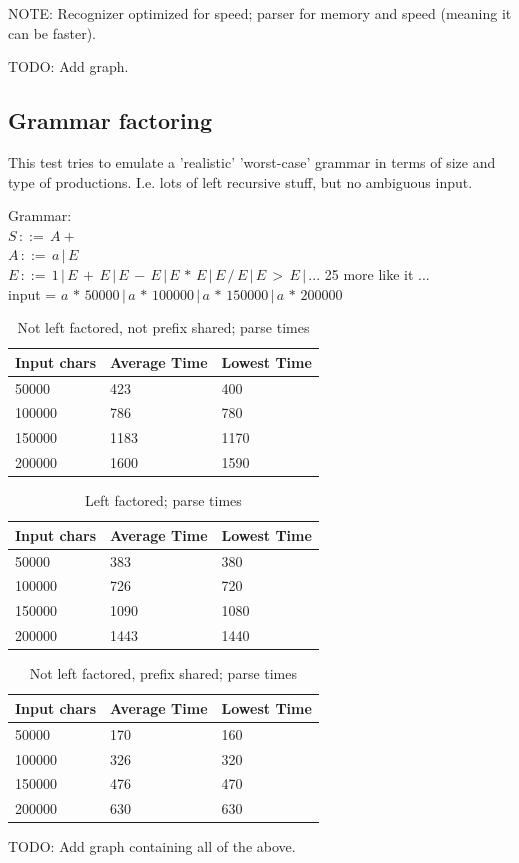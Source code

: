 \documentclass[a4paper,10pt]{article}
\begin{document}
NOTE: Recognizer optimized for speed; parser for memory and speed (meaning it can be faster).

TODO: Add graph.

\subsection{Grammar factoring}

This test tries to emulate a 'realistic' 'worst-case' grammar in terms of size and type of productions. I.e. lots of left recursive stuff, but no ambiguous input.

Grammar:\\
$S\,::=\,A+$\\
$A\,::=\,a\,|\,E$\\
$E\,::=\,1\,|\,E\,+\,E\,|\,E\,-\,E\,|\,E\,*\,E\,|\,E\,/\,E\,|\,E\,>\,E\,|\,...$ 25 more like it ...\\
input = $a\,*\,50000\,|\,a\,*\,100000\,|\,a\,*\,150000\,|\,a\,*\,200000$

\begin{table}[H]
\centering
\begin{tabular}{ | p{5em} | p{7em} | p{6em} | }
  \hline
  Input chars & Average Time & Lowest Time \\
  \hline
  50000 & 423 & 400 \\
  100000 & 786 & 780 \\
  150000 & 1183 & 1170 \\
  200000 & 1600 & 1590 \\
  \hline
\end{tabular}
\caption{Not left factored, not prefix shared; parse times}
\end{table}

\begin{table}[H]
\centering
\begin{tabular}{ | p{5em} | p{7em} | p{6em} | }
  \hline
  Input chars & Average Time & Lowest Time \\
  \hline
  50000 & 383 & 380 \\
  100000 & 726 & 720 \\
  150000 & 1090 & 1080 \\
  200000 & 1443 & 1440 \\
  \hline
\end{tabular}
\caption{Left factored; parse times}
\end{table}

\begin{table}[H]
\centering
\begin{tabular}{ | p{5em} | p{7em} | p{6em} | }
  \hline
  Input chars & Average Time & Lowest Time \\
  \hline
  50000 & 170 & 160 \\
  100000 & 326 & 320 \\
  150000 & 476 & 470 \\
  200000 & 630 & 630 \\
  \hline
\end{tabular}
\caption{Not left factored, prefix shared; parse times}
\end{table}

TODO: Add graph containing all of the above.
\end{document}
